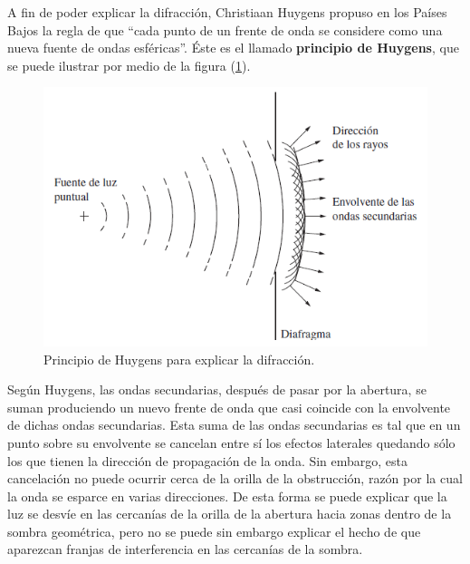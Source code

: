 \documentclass[14pt]{extarticle}
\begin{document}
A fin de poder explicar la difracción, Christiaan Huygens propuso en los Países Bajos la regla de que \enquote{cada punto de un frente de onda se considere como una nueva fuente de ondas esféricas}. Éste es el llamado \textbf{principio de Huygens}, que se puede ilustrar por medio de la figura (\ref{fig:figura_X_02}).
\begin{figure}[H]
    \centering
    \includegraphics[scale=0.75]{Imagenes/Difraccion_02.png}
    \caption{Principio de Huygens para explicar la difracción.}
    \label{fig:figura_X_02}
\end{figure}
Según Huygens, las ondas secundarias, después de pasar por la abertura, se suman produciendo un nuevo frente de onda que casi coincide con la envolvente de dichas ondas secundarias. Esta suma de las ondas secundarias es tal que en un punto sobre su envolvente se cancelan entre sí los efectos laterales quedando sólo los que tienen la dirección de propagación de la onda. Sin embargo, esta cancelación no puede ocurrir cerca de la orilla de la obstrucción, razón por la cual la onda se esparce en varias direcciones. De esta forma se puede explicar que la luz se desvíe en las cercanías de la orilla de la abertura hacia zonas dentro de la sombra geométrica, pero no se puede sin embargo explicar el hecho de que aparezcan franjas de interferencia en las cercanías de la sombra.
\par
\end{document}

